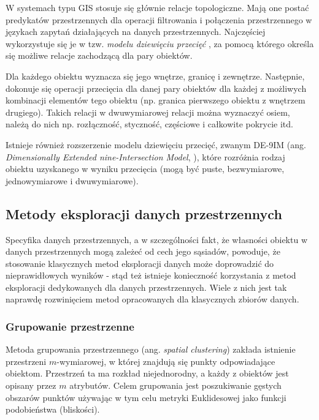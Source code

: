\documentclass[12pt]{article}
\begin{document}
W systemach typu GIS stosuje się głównie relacje topologiczne. Mają one postać predykatów przestrzennych dla operacji filtrowania i połączenia przestrzennego w językach zapytań działających na danych przestrzennych. Najczęściej wykorzystuje się je w tzw. \textit{modelu dziewięciu przecięć} \cite{9sec}, za pomocą którego określa się możliwe relacje zachodzącą dla pary obiektów.

Dla każdego obiektu wyznacza się jego wnętrze, granicę i zewnętrze. Następnie, dokonuje się operacji przecięcia dla danej pary obiektów dla każdej z możliwych kombinacji elementów tego obiektu (np. granica pierwszego obiektu z wnętrzem drugiego). Takich relacji w dwuwymiarowej relacji można wyznaczyć osiem, należą do nich np. rozłączność, styczność, częściowe i całkowite pokrycie itd.

Istnieje również rozszerzenie modelu dziewięciu przecięć, zwanym DE-9IM (ang. \textit{Dimensionally Extended nine-Intersection Model}, \cite{9sec2}), które rozróżnia rodzaj obiektu uzyskanego w wyniku przecięcia (mogą być puste, bezwymiarowe, jednowymiarowe i dwuwymiarowe).

\subsection{Metody eksploracji danych przestrzennych}

Specyfika danych przestrzennych, a w szczególności fakt, że własności obiektu w danych przestrzennych mogą zależeć od cech jego sąsiadów, powoduje, że stosowanie klasycznych metod eksploracji danych może doprowadzić do nieprawidłowych wyników \cite{klasykchuj1} \cite{klasykchuj2} - stąd też istnieje konieczność korzystania z metod eksploracji dedykowanych dla danych przestrzennych. Wiele z nich jest tak naprawdę rozwinięciem metod opracowanych dla klasycznych zbiorów danych.

\subsubsection{Grupowanie przestrzenne}

Metoda grupowania przestrzennego (ang. \textit{spatial clustering}) zakłada istnienie przestrzeni $m$-wymiarowej, w której znajdują się punkty odpowiadające obiektom. Przestrzeń ta ma rozkład niejednorodny, a każdy z obiektów jest opisany przez $m$ atrybutów. Celem grupowania jest poszukiwanie gęstych obszarów punktów używając w tym celu metryki Euklidesowej jako funkcji podobieństwa (bliskości).
\end{document}

